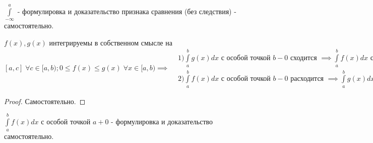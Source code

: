\documentclass[../main.tex]{subfiles}
\begin{document}
$\int\limits_{-\infty}^{a} $ - формулировка и доказательство признака сравнения (без следствия) - самостоятельно. 
\begin{theorem}
    $f(x),g(x)$ интегрируемы в собственном смысле на $[a,c]\;\forall c\in[a,b); 0\leqslant f(x)\leqslant g(x)\;\forall x\in[a,b)\implies \begin{aligned}&1)\int\limits_{a   }^{b    } g(x)dx \text{ с особой точкой $b-0 $ сходится } \implies \int\limits_{a    }^{b    } f(x)dx \text{ с особой точкой $b-0$ сходится}\\ &2)\int\limits_{a  }^{b    } f(x)dx \text{ с особой точкой $b-0$ расходится }\implies \int\limits_{a    }^{b    } g(x)dx \text{ с особой точкой $b-0 $ расходится} \end{aligned}$
\end{theorem} 
\begin{proof}
    Самостоятельно.   
\end{proof}
$\int\limits_{a }^{b    } f(x)dx$ с особой точкой $a+0$ - формулировка и доказательство самостоятельно.
\end{document}
